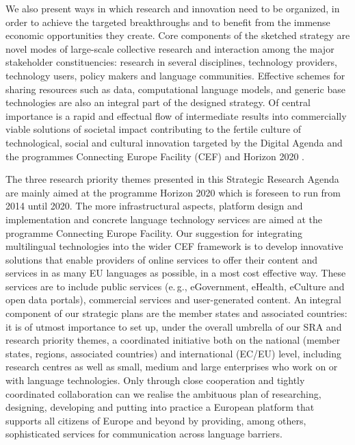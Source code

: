 \documentclass[10pt, plain]{../../metanetpaper}
\begin{document}
\begin{multicols}{2}
We also present ways in which research and innovation need to be organized, in order to achieve the targeted breakthroughs and to benefit from the immense economic opportunities they create. Core components of the sketched strategy are novel modes of large-scale collective research and interaction among the major stakeholder constituencies: research in several disciplines, technology providers, technology users, policy makers and language communities. Effective schemes for sharing resources such as data, computational language models, and generic base technologies are also an integral part of the designed strategy. Of central importance is a rapid and effectual flow of intermediate results into commercially viable solutions of societal impact contributing to the fertile culture of technological, social and cultural innovation targeted by the Digital Agenda \cite{DA2010} and the programmes Connecting Europe Facility (CEF) \cite{CEF2011} and Horizon 2020 \cite{H2020}.


The three research priority themes presented in this Strategic Research Agenda are mainly aimed at the programme Horizon 2020 which is foreseen to run from 2014 until 2020. The more infrastructural aspects, platform design and implementation and concrete language technology services are aimed at the programme Connecting Europe Facility. Our suggestion for integrating multilingual technologies into the wider CEF framework is to develop innovative solutions that enable providers of online services to offer their content and services in as many EU languages as possible, in a most cost effective way. These services are to include public services (e.\,g., eGovernment, eHealth, eCulture and open data portals), commercial services and user-generated content. An integral component of our strategic plans are the member states and associated countries: it is of utmost importance to set up, under the overall umbrella of our SRA and research priority themes, a coordinated initiative both on the national (member states, regions, associated countries) and international (EC/EU) level, including research centres as well as small, medium and large enterprises who work on or with language technologies. Only through close cooperation and tightly coordinated collaboration can we realise the ambituous plan of researching, designing, developing and putting into practice a European platform that supports all citizens of Europe and beyond by providing, among others, sophisticated services for communication across language barriers.


\end{multicols}
\end{document}
